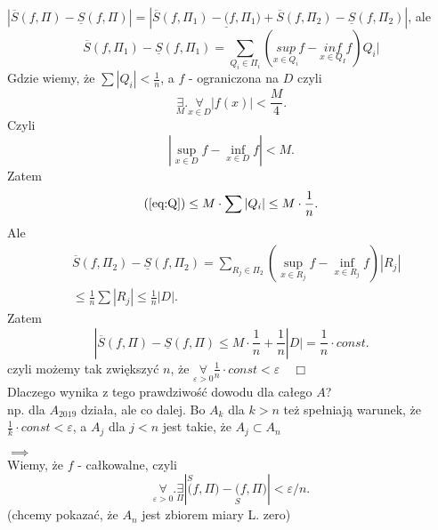 \documentclass[../main.tex]{subfiles}
\begin{document}
\begin{dowod}
        $|\overline{S}(f,\Pi) - \underline{S}(f,\Pi)| = |\overline{S}(f,\Pi_1) - \underline(f,\Pi_1) + \overline{S}(f,\Pi_2) - \underline{S}(f,\Pi_2)|$, ale
        \begin{equation}\label{eq:Q}
            \overline{S}(f,\Pi_1) - \underline{S}(f,\Pi_1) = \sum_{Q_i\in\Pi_i}(\underset{x\in Q_i}{sup} f - \underset{x\in Q_I}{inf} f) Q_i |
        \end{equation}
        Gdzie wiemy, że $\sum |Q_i| < \frac{1}{n}$, a $f$ - ograniczona na $D$ czyli
        \[
            \underset{M}{\exists} .\underset{x\in D}{\forall} |f(x)| < \frac{M}{4}
        .\] Czyli
        \[
        |\underset{x\in D}{\sup} f - \underset{x\in D}{\inf} f | < M
        .\] Zatem
        \[
            \text{(\ref{eq:Q})} \le M \cdot \sum |Q_i| \le M \cdot  \frac{1}{n}
        .\]
        Ale
        \begin{align*}
            &\overline{S}(f,\Pi_2) - \underline{S}(f,\Pi_2) = \sum_{R_j \in \Pi_2}(\underset{x\in R_j}{\sup} f - \underset{x\in R_j}{\inf} f) |R_j|\\
            &\le \frac{1}{n} \sum |R_j| \le \frac{1}{n} |D|
        .\end{align*}
        Zatem
        \[
            |\overline{S}(f,\Pi) - \underline{S}(f,\Pi) \le M \cdot \frac{1}{n} + \frac{1}{n} |D| = \frac{1}{n} \cdot  const
        .\]
        czyli możemy tak zwiększyć $n$, że $\underset{\varepsilon>0}{\forall} \frac{1}{n}\cdot const < \varepsilon \quad\Box$\\
        Dlaczego wynika z tego prawdziwość dowodu dla całego $A$?\\
        np. dla $A_{2019}$ działa, ale co dalej. Bo $A_k$ dla $k>n$ też spełniają warunek, że $\frac{1}{k}\cdot const < \varepsilon$, a $A_j$ dla $j<n$ jest takie, że $A_j \subset A_n$

        $\implies$\\
        Wiemy, że $f$ - całkowalne, czyli
        \[
            \underset{\varepsilon>0}{\forall} . \underset{\Pi}{\exists} |\overset{S}(f,\Pi) - \underset{S}(f,\Pi) | < \varepsilon / n
        .\] (chcemy pokazać, że $A_n$ jest zbiorem miary L. zero)


\end{dowod}
\end{document}
